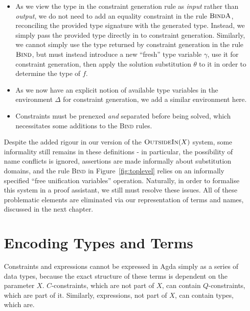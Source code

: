 \documentclass[a4paper]{jfp}
\newcommand{\outsidein}{\textsc{OutsideIn}(X)}
\begin{document}
\begin{itemize}

      \item As we view the type in the constraint generation rule as \emph{input} rather than \emph{output}, we do not need to add an equality
         constraint in the rule $\textsc{BindA}$, reconciling the provided type signature with the generated type. Instead, we simply pass the
         provided type directly in to constraint generation. Similarly, we cannot simply use the type returned by constraint generation in the rule
         $\textsc{Bind}$, but must instead introduce a new ``fresh'' type variable $\gamma$, use it for constraint generation, then apply the solution
         substitution $\theta$ to it in order to determine the type of $f$.

      \item As we now have an explicit notion of available type variables in the environment $\Delta$ for constraint generation, we add a similar
         environment here.

      \item Constraints must be prenexed \emph{and} separated before being solved, which necessitates some additions to the \textsc{Bind} rules.

\end{itemize}

Despite the added rigour in our version of the $\outsidein$ system, some informality still remains in these definitions - in particular, the
possibility of name conflicts is ignored, assertions are made informally about substitution domains, and the rule \textsc{Bind} in
Figure~\ref{fig:toplevel} relies on an informally specified ``free unification variables'' operation. Naturally, in order to formalise this system in
a proof assistant, we still must resolve these issues. All of these problematic elements are eliminated via our representation of terms and names,
discussed in the next chapter.

\newpage


\section{Encoding Types and Terms}
\label{sec:terms}

Constraints and expressions cannot be expressed in Agda simply as a series of data types, because the exact structure of these terms is dependent on
the parameter $X$. $C$-constraints, which are not part of $X$, can contain $Q$-constraints, which are part of it. Similarly, expressions, not part of
$X$, can contain types, which are.
\end{document}
